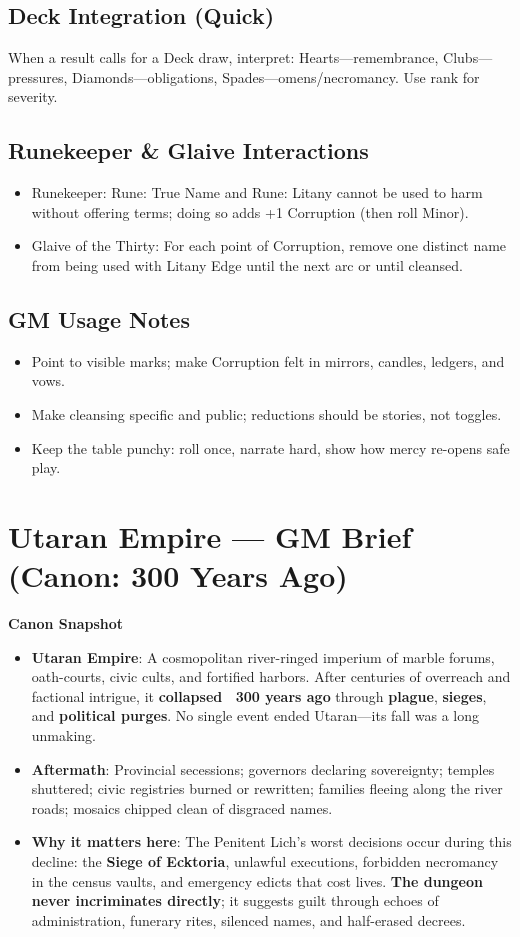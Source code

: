 \documentclass[18pt, letterpaper, twoside]{article}
\newcommand{\corruptiontitle}[1]{\subsection*{#1}}
\begin{document}
\begin{enumerate}
\corruptiontitle{Deck Integration (Quick)}
When a result calls for a Deck draw, interpret: Hearts---remembrance, Clubs---pressures, Diamonds---obligations, Spades---omens/necromancy. Use rank for severity.

\corruptiontitle{Runekeeper \& Glaive Interactions}
\begin{itemize}
    \item Runekeeper: Rune: True Name and Rune: Litany cannot be used to harm without offering terms; doing so adds +1 Corruption (then roll Minor).
    \item Glaive of the Thirty: For each point of Corruption, remove one distinct name from being used with Litany Edge until the next arc or until cleansed.
\end{itemize}

\corruptiontitle{GM Usage Notes}
\begin{itemize}
    \item Point to visible marks; make Corruption felt in mirrors, candles, ledgers, and vows.
    \item Make cleansing specific and public; reductions should be stories, not toggles.
    \item Keep the table punchy: roll once, narrate hard, show how mercy re-opens safe play.
\end{itemize}

\section{Utaran Empire --- GM Brief (Canon: 300 Years Ago)}

\textbf{Canon Snapshot}
\begin{itemize}
    \item \textbf{Utaran Empire}: A cosmopolitan river-ringed imperium of marble forums, oath-courts, civic cults, and fortified harbors. After centuries of overreach and factional intrigue, it \textbf{collapsed ~300 years ago} through \textbf{plague}, \textbf{sieges}, and \textbf{political purges}. No single event ended Utaran---its fall was a long unmaking.
    \item \textbf{Aftermath}: Provincial secessions; governors declaring sovereignty; temples shuttered; civic registries burned or rewritten; families fleeing along the river roads; mosaics chipped clean of disgraced names.
    \item \textbf{Why it matters here}: The Penitent Lich's worst decisions occur during this decline: the \textbf{Siege of Ecktoria}, unlawful executions, forbidden necromancy in the census vaults, and emergency edicts that cost lives. \textbf{The dungeon never incriminates directly}; it suggests guilt through echoes of administration, funerary rites, silenced names, and half-erased decrees.
\end{itemize}


\end{enumerate}
\end{document}
